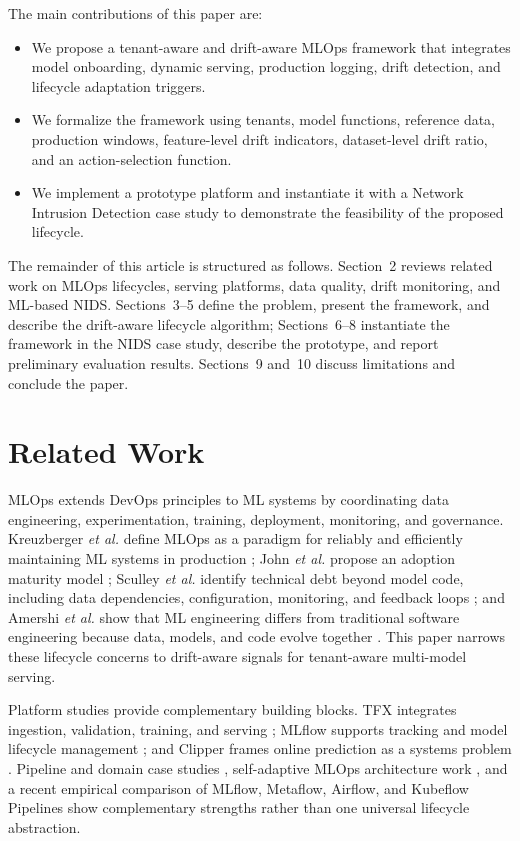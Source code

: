 \documentclass[runningheads]{llncs}
\begin{document}
The main contributions of this paper are:

\begin{itemize}
    \item We propose a tenant-aware and drift-aware MLOps framework that integrates model onboarding, dynamic serving, production logging, drift detection, and lifecycle adaptation triggers.
    \item We formalize the framework using tenants, model functions, reference data, production windows, feature-level drift indicators, dataset-level drift ratio, and an action-selection function.
    \item We implement a prototype platform and instantiate it with a Network Intrusion Detection case study to demonstrate the feasibility of the proposed lifecycle.
\end{itemize}

The remainder of this article is structured as follows. Section~2 reviews related work on MLOps lifecycles, serving platforms, data quality, drift monitoring, and ML-based NIDS. Sections~3--5 define the problem, present the framework, and describe the drift-aware lifecycle algorithm; Sections~6--8 instantiate the framework in the NIDS case study, describe the prototype, and report preliminary evaluation results. Sections~9 and~10 discuss limitations and conclude the paper.

\section{Related Work}

MLOps extends DevOps principles to ML systems by coordinating data engineering, experimentation, training, deployment, monitoring, and governance. Kreuzberger \textit{et al.} define MLOps as a paradigm for reliably and efficiently maintaining ML systems in production \cite{kreuzberger2023mlops}; John \textit{et al.} propose an adoption maturity model \cite{john2021towards}; Sculley \textit{et al.} identify technical debt beyond model code, including data dependencies, configuration, monitoring, and feedback loops \cite{sculley2015debt}; and Amershi \textit{et al.} show that ML engineering differs from traditional software engineering because data, models, and code evolve together \cite{amershi2019software}. This paper narrows these lifecycle concerns to drift-aware signals for tenant-aware multi-model serving.

Platform studies provide complementary building blocks. TFX integrates ingestion, validation, training, and serving \cite{baylor2017tfx}; MLflow supports tracking and model lifecycle management \cite{mlflow}; and Clipper frames online prediction as a systems problem \cite{crankshaw2017clipper}. Pipeline and domain case studies \cite{zhou2020pipeline,subramanya2022devops}, self-adaptive MLOps architecture work \cite{Bhatt2025HarmonE}, and a recent empirical comparison of MLflow, Metaflow, Airflow, and Kubeflow Pipelines \cite{MarcosMercade2026MLOpsFrameworks} show complementary strengths rather than one universal lifecycle abstraction.
\end{document}

